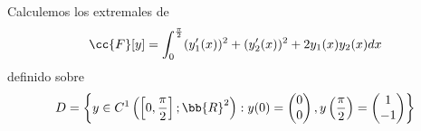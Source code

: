  \begin{ejemplo}
    Calculemos los extremales de 
    \begin{gather*}
        \cc{F}[y] = \int_0^{\frac{\pi}{2}} (y_1'(x))^2 + (y_2'(x))^2 + 2y_1(x)y_2(x) dx
    \end{gather*}
    definido sobre
    \begin{gather*}
        D = \left\{y\in C^1\left(\left[0,\frac{\pi}{2}\right];\bb{R}^2\right) : y(0) = 
        \begin{pmatrix}
            0\\ 0
        \end{pmatrix}
        , y\left(\frac{\pi}{2}\right) = 
        \begin{pmatrix}
            1 \\ -1
        \end{pmatrix}
        \right\}
    \end{gather*}
 \end{ejemplo}

